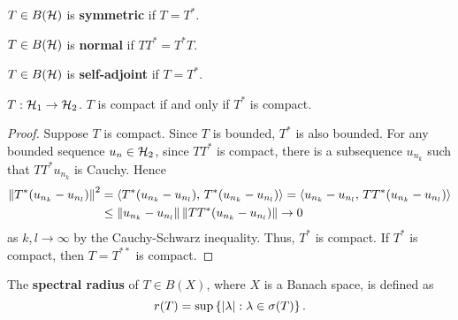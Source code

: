 \begin{definition}
    $T\in B(\mathcal{H})$ is \textbf{symmetric} if $T = T^*$. 
\end{definition}

\begin{definition}
    $T\in B(\mathcal{H})$ is \textbf{normal} if $TT^* = T^*T$.
\end{definition}

\begin{definition}
    $T\in B(\mathcal{H})$ is \textbf{self-adjoint} if $T = T^*$.
\end{definition}
\begin{proposition}
    $T:\mathcal{H}_1\to\mathcal{H}_2$. $T$ is compact if and only if $T^*$ is compact.
\end{proposition}
\begin{proof}
    Suppose $T$ is compact. Since $T$ is bounded, $T^*$ is also bounded. For any 
    bounded sequence $u_n\in\mathcal{H}_2$, since $TT^*$ is compact, there is a subsequence 
    $u_{n_k}$ such that $TT^*u_{n_k}$ is Cauchy. Hence 
    \begin{equation*}
        \begin{split}
            \left\lVert {T^*(u_{n_k} - u_{n_l})} \right\rVert^2 &= \left\langle {T^*(u_{n_k} - u_{n_l})},\, {T^*(u_{n_k} - u_{n_l})} \right\rangle 
            = \left\langle {u_{n_k} - u_{n_l}},\, {TT^*(u_{n_k} - u_{n_l})} \right\rangle \\
            &\leq \left\lVert {u_{n_k} - u_{n_l}} \right\rVert\left\lVert {TT^*(u_{n_k} - u_{n_l})} \right\rVert\to 0
        \end{split}
    \end{equation*}
    as $k,l\to\infty$ by the Cauchy-Schwarz inequality. Thus, $T^*$ is compact. 
    If $T^*$ is compact, then $T = T^{**}$ is compact.
\end{proof}

\begin{definition}
    The \textbf{spectral radius} of $T\in B(X)$, where $X$ is a Banach space, is defined as 
    \begin{equation*}
        r(T) = \sup\left\{ {\left\lvert {\lambda} \right\rvert:\lambda\in\sigma(T)} \right\}.
    \end{equation*}
\end{definition}

